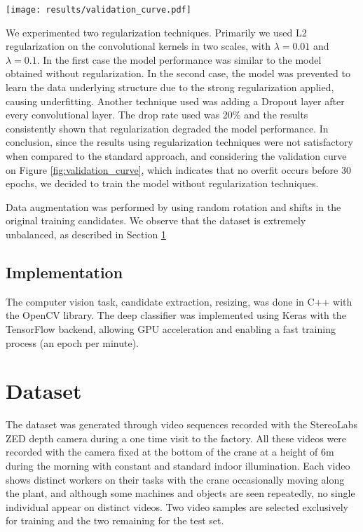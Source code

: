         \begin{figure*}[!t]
        \centering
        \texttt{[image: results/validation\_curve.pdf]}
        \caption{Validation curve. 70\% split on training set.}
        \label{fig:validation_curve}
        \end{figure*}

        We experimented two regularization techniques. Primarily we used L2 regularization on the convolutional kernels in two scales, with $\lambda = 0.01$ and $\lambda = 0.1$. In the first case the model performance was similar to the model obtained without regularization. In the second case, the model was prevented to learn the data underlying structure due to the strong regularization applied, causing underfitting. Another technique used was adding a Dropout layer after every convolutional layer. The drop rate used was 20\% and the results consistently shown that regularization degraded the model performance. In conclusion, since the results using regularization techniques were not satisfactory when compared to the standard approach, and considering the validation curve on Figure \ref{fig:validation_curve}, which indicates that no overfit occurs before 30 epochs, we decided to train the model without regularization techniques.

        Data augmentation was performed by using random rotation and shifts in the original training candidates. We observe that the dataset is extremely unbalanced, as described in Section \ref{sec:dataset}

    \subsection{Implementation}
        The computer vision task, candidate extraction, resizing, was done in C++ with the OpenCV library. The deep classifier was implemented using Keras \cite{keras} with the TensorFlow \cite{tensorflow2015-whitepaper} backend, allowing GPU acceleration and enabling a fast training process (an epoch per minute).

\section{Dataset}
\label{sec:dataset}
The dataset was generated through video sequences recorded with the StereoLabs ZED depth camera during a one time visit to the factory. All these videos were recorded with the camera fixed at the bottom of the crane at a height of 6m during the morning with constant and standard indoor illumination. Each video shows distinct workers on their tasks with the crane occasionally moving along the plant, and although some machines and objects are seen repeatedly, no single individual appear on distinct videos. Two video samples are selected exclusively for training and the two remaining for the test set.

